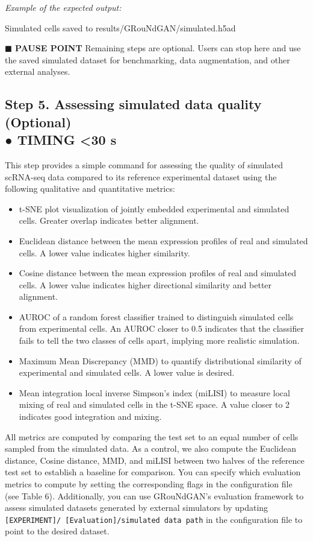 \begin{tcolorbox}
\textit{Example of the expected output: }
\begin{codeblock}
Simulated cells saved to results/GRouNdGAN/simulated.h5ad
\end{codeblock}
\textbf{◼ PAUSE POINT} Remaining steps are optional. Users can stop here and use the saved simulated
dataset for benchmarking, data augmentation, and other external analyses. 

\subsection*{Step 5. Assessing simulated data quality (Optional)\\● TIMING <30 s}

This step provides a simple command for assessing the quality of simulated scRNA-seq data
compared to its reference experimental dataset using the following qualitative and quantitative
metrics:

\begin{itemize}
    \item t-SNE plot visualization of jointly embedded experimental and simulated cells. Greater
overlap indicates better alignment.
    \item Euclidean distance between the mean expression profiles of real and simulated cells. A
lower value indicates higher similarity.
    \item Cosine distance between the mean expression profiles of real and simulated cells. A lower
value indicates higher directional similarity and better alignment.
	\item AUROC of a random forest classifier trained to distinguish simulated cells from
experimental cells. An AUROC closer to 0.5 indicates that the classifier fails to tell the two
classes of cells apart, implying more realistic simulation. 
	\item Maximum Mean Discrepancy (MMD) to quantify distributional similarity of experimental
and simulated cells. A lower value is desired. 
	\item Mean integration local inverse Simpson’s index (miLISI) to measure local mixing of real
and simulated cells in the t-SNE space. A value closer to 2 indicates good integration and
mixing. 
\end{itemize}

All metrics are computed by comparing the test set to an equal number of cells sampled from
the simulated data. As a control, we also compute the Euclidean distance, Cosine distance, MMD,
and miLISI between two halves of the reference test set to establish a baseline for comparison. You can specify which evaluation metrics to compute by setting the corresponding flags in the
configuration file (see Table 6). Additionally, you can use GRouNdGAN's evaluation framework to
assess simulated datasets generated by external simulators by updating \texttt{[EXPERIMENT]/
[Evaluation]/simulated data path} in the configuration file to point to the desired
dataset.


\end{tcolorbox}
